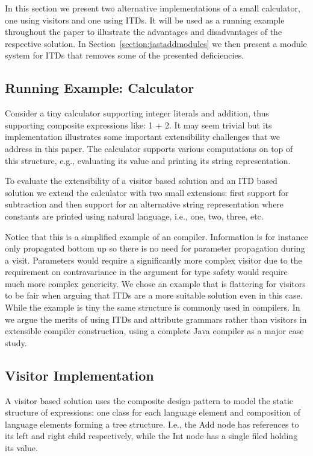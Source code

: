 In this section we present two alternative implementations of a small
calculator, one using visitors and one using ITDs. It will be used as a
running example throughout the paper to illustrate the advantages and
disadvantages of the respective solution. In Section~\ref{section:jastaddmodules}
we then present a module system for ITDs that removes some of the presented
deficiencies.

\subsection{Running Example: Calculator}
Consider a tiny calculator supporting integer literals and addition, thus 
supporting composite expressions like: 1 + 2. It may seem trivial but its 
implementation illustrates some important extensibility challenges that we 
address in this paper. The calculator supports various computations on top 
of this structure, e.g., evaluating its value and printing its string
representation.

To evaluate the extensibility of a visitor based solution and an ITD based
solution we extend the calculator with two small extensions: first support
for subtraction and then support for an alternative string representation 
where constants are printed using natural language, i.e., one, two, 
three, etc.


Notice that this is a simplified example of an compiler. Information is
for instance only propagated bottom up so there is no need for parameter
propagation during a visit. Parameters would require a significantly more 
complex visitor due to the requirement on contravariance in the argument 
for type safety would require much more complex genericity. We chose an 
example that is flattering for visitors to be fair when arguing that ITDs 
are a more suitable solution even in this case. While the example is 
tiny the same structure is commonly used in compilers. In~\cite{aosd08abc} we argue 
the merits of using ITDs and attribute grammars rather than visitors in 
extensible compiler construction, using a complete Java compiler as a 
major case study.

\subsection{Visitor Implementation}
A visitor based solution uses the composite design pattern to model the
static structure of expressions: one class for each language element and
composition of language elements forming a tree structure. I.e., the 
Add node has references to its left and right child respectively, while 
the Int node has a single filed holding its value.

